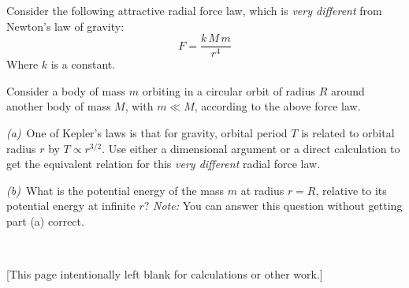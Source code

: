 \documentclass[12pt]{article}
\begin{document}
Consider the following attractive radial force law, which is
\emph{very different} from Newton's law of gravity:
\begin{equation}
F = \frac{k\,M\,m}{r^4}
\end{equation}
Where $k$ is a constant.

Consider a body of mass $m$ orbiting in a circular orbit of radius $R$
around another body of mass $M$, with $m\ll M$, according to the above
force law.

\textsl{(a)}~One of Kepler's laws is that for gravity, orbital period
$T$ is related to orbital radius $r$ by $T\propto r^{3/2}$.  Use
either a dimensional argument or a direct calculation to get the
equivalent relation for this \emph{very different} radial force law.

\vfill

\textsl{(b)}~What is the potential energy of the mass $m$ at radius
$r=R$, relative to its potential energy at infinite $r$?  \emph{Note:}
You can answer this question without getting part (a) correct.

\vfill ~

\clearpage

[This page intentionally left blank for calculations or other work.]
\end{document}

